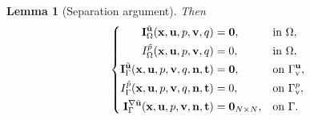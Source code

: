 \documentclass[oneside,11pt]{book}
\numberwithin{equation}{section}
\newtheorem{lemma}{Lemma}[section]
\begin{document}
\begin{enumerate}[leftmargin=0mm]
\begin{itemize}[leftmargin=0in]
\begin{lemma}[Separation argument]
            Then
            \begin{equation}
                \label{separation argument/general stationary Stokes/case 1.1/3}
                \left\{\begin{split}
                    {\bf I}_\Omega^{\tilde{\bf u}}({\bf x},{\bf u},p,{\bf v},q) &= {\bf 0},&&\mbox{in }\Omega,\\
                    I_\Omega^{\tilde{p}}({\bf x},{\bf u},p,{\bf v},q) &= 0,&&\mbox{in }\Omega,\\
                    {\bf I}_\Gamma^{\tilde{\bf u}}({\bf x},{\bf u},p,{\bf v},q,{\bf n},{\bf t}) &= {\bf 0},&&\mbox{on }\Gamma_{\rm v}^{\bf u},\\
                    I_\Gamma^{\tilde{p}}({\bf x},{\bf u},p,{\bf v},q,{\bf n},{\bf t}) &= 0,&&\mbox{on }\Gamma_{\rm v}^p,\\
                    {\bf I}_\Gamma^{\nabla\tilde{\bf u}}({\bf x},{\bf u},p,{\bf v},{\bf n},{\bf t}) &= {\bf 0}_{N\times N},&&\mbox{on }\Gamma.
                \end{split}\right.
            \end{equation}
        \end{lemma}
    

\end{itemize}
\end{enumerate}
\end{document}
